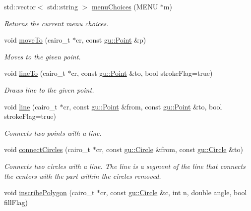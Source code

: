 \begin{DoxyCompactItemize}
std\+::vector$<$ std\+::string $>$ \hyperlink{namespaceslb_1_1core_1_1util_a46276e10206643d3cee0d5c2c0eeb5ac}{menu\+Choices} (M\+E\+NU $\ast$m)
\begin{DoxyCompactList}\small\item\em Returns the current menu choices. \end{DoxyCompactList}\item 
void \hyperlink{namespaceslb_1_1core_1_1util_a8d1707b9caf4ff4b66d90c512974bd19}{move\+To} (cairo\+\_\+t $\ast$cr, const \hyperlink{structslb_1_1core_1_1util_1_1gu_1_1Point}{gu\+::\+Point} \&p)
\begin{DoxyCompactList}\small\item\em Moves to the given point. \end{DoxyCompactList}\item 
void \hyperlink{namespaceslb_1_1core_1_1util_a5ceb479b918ab45219b1b509183a57cc}{line\+To} (cairo\+\_\+t $\ast$cr, const \hyperlink{structslb_1_1core_1_1util_1_1gu_1_1Point}{gu\+::\+Point} \&to, bool stroke\+Flag=true)
\begin{DoxyCompactList}\small\item\em Draws line to the given point. \end{DoxyCompactList}\item 
void \hyperlink{namespaceslb_1_1core_1_1util_a05a341116f08209b05c9822725be127e}{line} (cairo\+\_\+t $\ast$cr, const \hyperlink{structslb_1_1core_1_1util_1_1gu_1_1Point}{gu\+::\+Point} \&from, const \hyperlink{structslb_1_1core_1_1util_1_1gu_1_1Point}{gu\+::\+Point} \&to, bool stroke\+Flag=true)
\begin{DoxyCompactList}\small\item\em Connects two points with a line. \end{DoxyCompactList}\item 
void \hyperlink{namespaceslb_1_1core_1_1util_ac07fdd8a1daaeee3d5c8b8445c5c9110}{connect\+Circles} (cairo\+\_\+t $\ast$cr, const \hyperlink{structslb_1_1core_1_1util_1_1gu_1_1Circle}{gu\+::\+Circle} \&from, const \hyperlink{structslb_1_1core_1_1util_1_1gu_1_1Circle}{gu\+::\+Circle} \&to)
\begin{DoxyCompactList}\small\item\em Connects two circles with a line. The line is a segment of the line that connects the centers with the part within the circles removed. \end{DoxyCompactList}\item 
void \hyperlink{namespaceslb_1_1core_1_1util_a265ab01b21987f23478c4a960a50820e}{inscribe\+Polygon} (cairo\+\_\+t $\ast$cr, const \hyperlink{structslb_1_1core_1_1util_1_1gu_1_1Circle}{gu\+::\+Circle} \&c, int n, double angle, bool fill\+Flag)

\end{DoxyCompactItemize}
